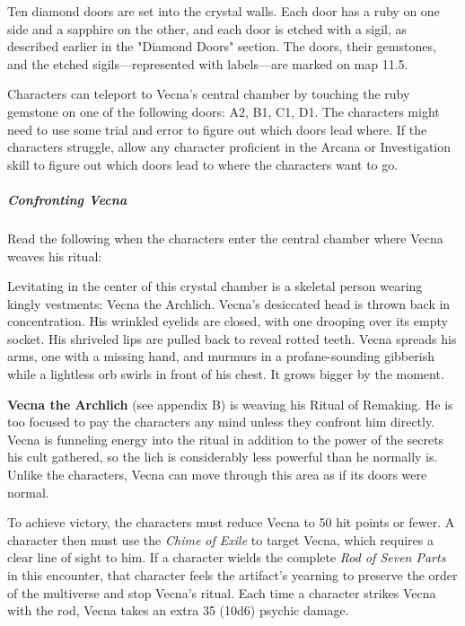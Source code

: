 \documentclass[10pt,a4paper,twoside,bg=print,twocolumn,openany,nodeprecatedcode]{dndbook}
\begin{document}
Ten diamond doors are set into the crystal walls. Each door has a ruby on one side and a sapphire on the other, and each door is etched with a sigil, as described earlier in the "Diamond Doors" section. The doors, their gemstones, and the etched sigils—represented with labels—are marked on map 11.5.

Characters can teleport to Vecna's central chamber by touching the ruby gemstone on one of the following doors: A2, B1, C1, D1. The characters might need to use some trial and error to figure out which doors lead where. If the characters struggle, allow any character proficient in the Arcana or Investigation skill to figure out which doors lead to where the characters want to go.

\subparagraph{Confronting Vecna}
Read the following when the characters enter the central chamber where Vecna weaves his ritual:

\begin{DndReadAloud}{}
Levitating in the center of this crystal chamber is a skeletal person wearing kingly vestments: Vecna the Archlich. Vecna's desiccated head is thrown back in concentration. His wrinkled eyelids are closed, with one drooping over its empty socket. His shriveled lips are pulled back to reveal rotted teeth. Vecna spreads his arms, one with a missing hand, and murmurs in a profane-sounding gibberish while a lightless orb swirls in front of his chest. It grows bigger by the moment.

\end{DndReadAloud}

\textbf{Vecna the Archlich} (see appendix B) is weaving his Ritual of Remaking. He is too focused to pay the characters any mind unless they confront him directly. Vecna is funneling energy into the ritual in addition to the power of the secrets his cult gathered, so the lich is considerably less powerful than he normally is. Unlike the characters, Vecna can move through this area as if its doors were normal.

To achieve victory, the characters must reduce Vecna to 50 hit points or fewer. A character then must use the \textit{Chime of Exile} to target Vecna, which requires a clear line of sight to him. If a character wields the complete \textit{Rod of Seven Parts} in this encounter, that character feels the artifact's yearning to preserve the order of the multiverse and stop Vecna's ritual. Each time a character strikes Vecna with the rod, Vecna takes an extra 35 (10d6) psychic damage.
\end{document}
